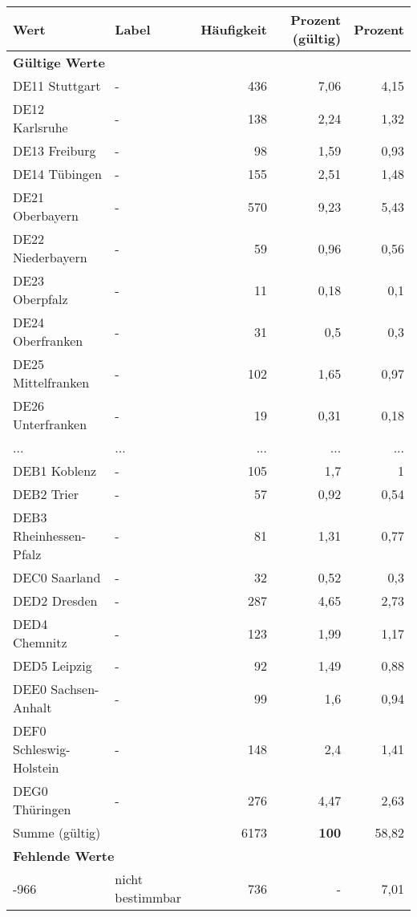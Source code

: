      \begin{longtable}{Xlrrr}
     \toprule
     \textbf{Wert} & \textbf{Label} & \textbf{Häufigkeit} & \textbf{Prozent (gültig)} & \textbf{Prozent} \\
     \endhead
     \midrule
     \multicolumn{5}{l}{\textbf{Gültige Werte}}\\
        \multicolumn{1}{X}{DE11 Stuttgart} & - & 436 & 7,06 & 4,15 \\
        \multicolumn{1}{X}{DE12 Karlsruhe} & - & 138 & 2,24 & 1,32 \\
        \multicolumn{1}{X}{DE13 Freiburg} & - & 98 & 1,59 & 0,93 \\
        \multicolumn{1}{X}{DE14 Tübingen} & - & 155 & 2,51 & 1,48 \\
        \multicolumn{1}{X}{DE21 Oberbayern} & - & 570 & 9,23 & 5,43 \\
        \multicolumn{1}{X}{DE22 Niederbayern} & - & 59 & 0,96 & 0,56 \\
        \multicolumn{1}{X}{DE23 Oberpfalz} & - & 11 & 0,18 & 0,1 \\
        \multicolumn{1}{X}{DE24 Oberfranken} & - & 31 & 0,5 & 0,3 \\
        \multicolumn{1}{X}{DE25 Mittelfranken} & - & 102 & 1,65 & 0,97 \\
        \multicolumn{1}{X}{DE26 Unterfranken} & - & 19 & 0,31 & 0,18 \\
       ... & ... & ... & ... & ... \\
        \multicolumn{1}{X}{DEB1 Koblenz} & - & 105 & 1,7 & 1 \\
        \multicolumn{1}{X}{DEB2 Trier} & - & 57 & 0,92 & 0,54 \\
        \multicolumn{1}{X}{DEB3 Rheinhessen-Pfalz} & - & 81 & 1,31 & 0,77 \\
        \multicolumn{1}{X}{DEC0 Saarland} & - & 32 & 0,52 & 0,3 \\
        \multicolumn{1}{X}{DED2 Dresden} & - & 287 & 4,65 & 2,73 \\
        \multicolumn{1}{X}{DED4 Chemnitz} & - & 123 & 1,99 & 1,17 \\
        \multicolumn{1}{X}{DED5 Leipzig} & - & 92 & 1,49 & 0,88 \\
        \multicolumn{1}{X}{DEE0 Sachsen-Anhalt} & - & 99 & 1,6 & 0,94 \\
        \multicolumn{1}{X}{DEF0 Schleswig-Holstein} & - & 148 & 2,4 & 1,41 \\
        \multicolumn{1}{X}{DEG0 Thüringen} & - & 276 & 4,47 & 2,63 \\
     \midrule
      \multicolumn{2}{l}{Summe (gültig)} & 6173 &
      \textbf{100} &
         58,82 \\
     \multicolumn{5}{l}{\textbf{Fehlende Werte}}\\
       -966 & nicht bestimmbar & 736 & - & 7,01 \\


\end{longtable}
